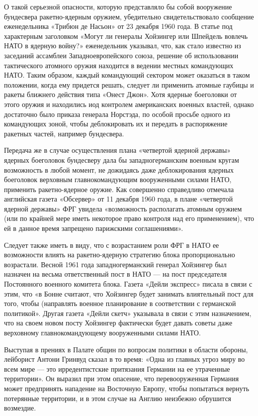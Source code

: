 \documentclass[12pt, a4paper, openany]{book}
\begin{document}
	О такой серьезной опасности, которую представляло бы собой вооружение бундесвера ракетно-ядерным оружием, убедительно свидетельствовало сообщение еженедельника «Трибюн де Насьон» от 23 декабря 1960 года. В статье под характерным заголовком «Могут ли генералы Хойзингер или Шпейдель вовлечь НАТО в ядерную войну?» еженедельник указывал, что, как стало известно из заседаний ассамблеи Западноевропейского союза, решение об использовании тактического атомного оружия находится в ведении местных командующих НАТО. Таким образом, каждый командующий сектором может оказаться в таком положении, когда ему придется решать, следует ли применить атомные гаубицы и ракеты ближнего действия типа «Онест Джон». Хотя ядерные боеголовки от этого оружия и находились иод контролем американских военных властей, однако достаточно было приказа генерала Норстэда, по особой просьбе одного из командующих зоной, чтобы деблокировать их и передать в распоряжение ракетных частей, например бундесвера.
	
	Передача же в случае осуществления плана «четвертой ядерной державы» ядерных боеголовок бундесверу дала бы западногерманским военным кругам возможность в любой момент, не дожидаясь даже деблокирования ядерных боеголовок верховным главнокомандующим вооруженными силами НАТО, применить ракетно-ядерное оружие. Как совершенно справедливо отмечала английская газета «Обсервер» от 11 декабря 1960 года, в плане «четвертой ядерной державы» ФРГ увидела «возможность располагать атомным оружием (или по крайней мере иметь некоторое право контроля над его применением), что ей в данное время запрещено парижскими соглашениями».
	
	Следует также иметь в виду, что с возрастанием роли ФРГ в НАТО ее возможности влиять на ракетно-ядерную стратегию блока пропорционально возрастали. Весной 1961 года западногерманский генерал Хойзингер был назначен на весьма ответственный пост в НАТО — на пост председателя Постоянного военного комитета блока. Газета «Дейли экспресс» писала в связи с этим, что «в Бонне считают, что Хойзингер будет занимать влиятельный пост для того, чтобы (направлять военное планирование в соответствии с германской политикой». Другая газета «Дейли скетч» указывала в связи с этим назначением, что на своем новом посту Хойзингер фактически будет давать советы даже верховному главнокомандующему вооруженными силами НАТО.
	
	Выступая в прениях в Палате общин по вопросам политики в области обороны, лейборист Антони Гринвуд сказал в то время: «Одна из главных угроз миру во всем мире — это ирредентистские притязания Германии на ее утраченные территории». Он выразил при этом опасение, что перевооруженная Германия может предпринять нападение на Восточную Европу, чтобы попытаться вернуть потерянные территории, и в этом случае на Англию неизбежно обрушится возмездие.
	
\end{document}
